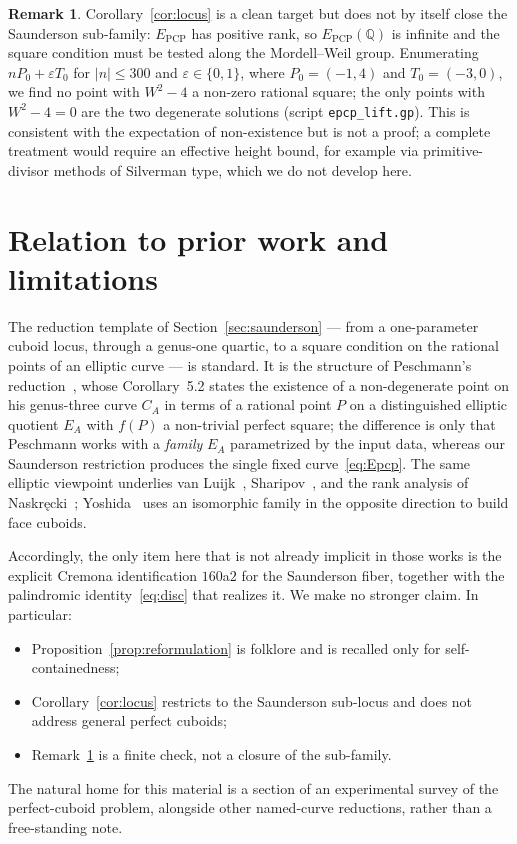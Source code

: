 \documentclass[11pt,reqno]{amsart}
\theoremstyle{plain}
\theoremstyle{definition}
\newtheorem{remark}{Remark}
\newcommand{\Q}{\mathbb{Q}}
\newcommand{\Epcp}{E_{\mathrm{PCP}}}
\begin{document}
\begin{remark}\label{rem:search}
Corollary~\ref{cor:locus} is a clean target but does not by itself close the
Saunderson sub-family: $\Epcp$ has positive rank, so $\Epcp(\Q)$ is infinite and
the square condition must be tested along the Mordell--Weil group. Enumerating
$nP_0+\varepsilon T_0$ for $|n|\le 300$ and $\varepsilon\in\{0,1\}$, where
$P_0=(-1,4)$ and $T_0=(-3,0)$, we find no point with $W^2-4$ a non-zero rational
square; the only points with $W^2-4=0$ are the two degenerate solutions
(script \texttt{epcp\_lift.gp}). This is consistent with the expectation of
non-existence but is not a proof; a complete treatment would require an
effective height bound, for example via primitive-divisor methods of
Silverman type, which we do not develop here.
\end{remark}

\section{Relation to prior work and limitations}\label{sec:relation}

The reduction template of Section~\ref{sec:saunderson} --- from a one-parameter
cuboid locus, through a genus-one quartic, to a square condition on the rational
points of an elliptic curve --- is standard. It is the structure of
Peschmann's reduction~\cite{Peschmann1}, whose Corollary~5.2 states the
existence of a non-degenerate point on his genus-three curve $C_A$ in terms of a
rational point $P$ on a distinguished elliptic quotient $E_A$ with $f(P)$ a
non-trivial perfect square; the difference is only that Peschmann works with a
\emph{family} $E_A$ parametrized by the input data, whereas our Saunderson
restriction produces the single fixed curve~\eqref{eq:Epcp}. The same elliptic
viewpoint underlies van Luijk~\cite{vanLuijk}, Sharipov~\cite{Sharipov2elliptic},
and the rank analysis of Naskr\k{e}cki~\cite{Naskrecki}; Yoshida~\cite{Yoshida}
uses an isomorphic family in the opposite direction to build face cuboids.

Accordingly, the only item here that is not already implicit in those works is
the explicit Cremona identification $160$a$2$ for the Saunderson fiber, together
with the palindromic identity~\eqref{eq:disc} that realizes it. We make no
stronger claim. In particular:
\begin{itemize}
\item Proposition~\ref{prop:reformulation} is folklore and is recalled only for
self-containedness;
\item Corollary~\ref{cor:locus} restricts to the Saunderson sub-locus and does
not address general perfect cuboids;
\item Remark~\ref{rem:search} is a finite check, not a closure of the
sub-family.
\end{itemize}
The natural home for this material is a section of an experimental survey of the
perfect-cuboid problem, alongside other named-curve reductions, rather than a
free-standing note.
\end{document}
